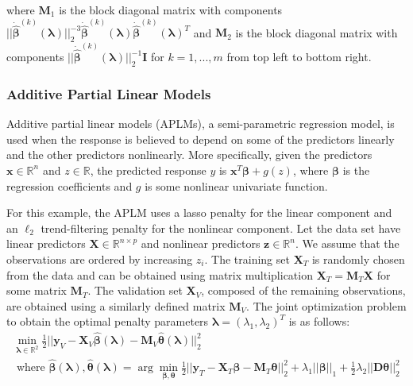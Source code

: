 \documentclass[10pt,letterpaper]{article}
\begin{document}
where $\boldsymbol{M}_1$ is the block diagonal matrix with  components 
$
|| \dot{\hat{\boldsymbol{\beta}}}^{(k)}(\boldsymbol{\lambda})||_2^{-3} \dot{\hat{\boldsymbol{\beta}}}^{(k)}(\boldsymbol{\lambda}) \dot{\hat{\boldsymbol{\beta}}}^{(k)}(\boldsymbol{\lambda})^T
$ and $\boldsymbol{M}_2$ is the block diagonal matrix with components
$||\dot{\hat{\boldsymbol{\beta}}}^{(k)}(\boldsymbol{\lambda})||_2^{-1} \boldsymbol{I}$
for $k = 1, ..., m$ 
from top left to bottom right.

\subsubsection{Additive Partial Linear Models}

Additive partial linear models (APLMs), a semi-parametric regression model, is used when the response is believed to depend on some of the predictors linearly and the other predictors nonlinearly. More specifically, given the predictors $\boldsymbol x \in \mathbb{R}^{n}$ and $z \in \mathbb{R}$, the predicted response $y$ is $\boldsymbol x^T\boldsymbol \beta + g(z)$, where $\boldsymbol \beta$ is the regression coefficients and $g$ is some nonlinear univariate function.

For this example, the APLM uses a lasso penalty for the linear component and an $\ell_2$ trend-filtering penalty for the nonlinear component. Let the data set have linear predictors $\boldsymbol{X} \in \mathbb{R}^{n \times p}$ and nonlinear predictors $\boldsymbol{z} \in \mathbb{R}^n$. We assume that the observations are ordered by increasing $z_i$. The training set $\boldsymbol{X}_T$ is randomly chosen from the data and can be obtained using matrix multiplication $ \boldsymbol{X}_T = \boldsymbol{M}_T \boldsymbol{X}$ for some matrix $\boldsymbol{M}_T$. The validation set $\boldsymbol{X}_V$, composed of the remaining observations, are obtained using a similarly defined matrix $\boldsymbol{M}_V$.
The joint optimization problem to obtain the optimal penalty parameters $\boldsymbol\lambda = (\lambda_1, \lambda_2)^T$ is as follows:
\begin{equation}
\begin{array}{c}
\min_{\boldsymbol\lambda \in \mathbb{R}^2} \frac{1}{2}
\bigl\lvert\bigl\lvert
\boldsymbol{y}_V
- \boldsymbol{X}_V\hat{\boldsymbol{\beta}}(\boldsymbol{\lambda})
- \boldsymbol{M}_V \hat{\boldsymbol{\theta}}(\boldsymbol{\lambda})
\bigl\rvert\bigl\rvert^2_2 \\
\text{ where } \hat{\boldsymbol{\beta}}(\boldsymbol{\lambda}),
\hat{\boldsymbol{\theta}}(\boldsymbol{\lambda}) =
\arg\min_{\boldsymbol{\beta}, \boldsymbol{\theta}}
\frac{1}{2} \bigl\lvert\bigl\lvert
\boldsymbol{y}_T
- \boldsymbol{X}_T\boldsymbol{\beta}
- \boldsymbol{M}_T \boldsymbol{\theta} \bigl\rvert\bigl\rvert^2_2
+ \lambda_1 \lvert\lvert \boldsymbol{\beta}
\rvert \rvert_1
+ \frac{1}{2} \lambda_2 \lvert\lvert \boldsymbol{D} \boldsymbol{\theta} \rvert \rvert_2^2
\end{array}
\end{equation}
\end{document}
